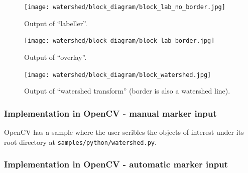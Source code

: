 \documentclass[a4paper]{article}
\begin{document}
\begin{multicols}{3}
\begin{figure}[H]
	\centering 
	    \captionsetup{width=0.25\textwidth}
    	\texttt{[image: watershed/block\_diagram/block\_lab\_no\_border.jpg]}
    \caption{Output of ``labeller''.} 
\end{figure}
\columnbreak
\begin{figure}[H]
	\centering %
	    \captionsetup{width=0.25\textwidth}
    	\texttt{[image: watershed/block\_diagram/block\_lab\_border.jpg]}
    \caption{Output of ``overlay''.} 
\end{figure}
\columnbreak
\begin{figure}[H]
	\centering %
	    \captionsetup{width=0.25\textwidth}
    	\texttt{[image: watershed/block\_diagram/block\_watershed.jpg]}
    \caption{Output of ``watershed transform'' (border is also a watershed line).} 
\end{figure}
\end{multicols}



\subsubsection{Implementation in OpenCV - manual marker input}

OpenCV has a sample where the user scribles the objects of interest under its root directory at \texttt{samples/python/watershed.py}.



\subsubsection{Implementation in OpenCV - automatic marker input}
\end{document}
